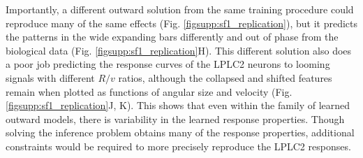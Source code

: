 \documentclass[pdftex,9pt,lineno]{elife}
\begin{document}
Importantly, a different outward solution from the same training procedure could reproduce many of the same effects (Fig. \ref{figsupp:sf1_replication}), but it predicts the patterns in the wide expanding bars differently and out of phase from the biological data (Fig. \ref{figsupp:sf1_replication}H). This different solution also does a poor job predicting the response curves of the LPLC2 neurons to looming signals with different $R/v$ ratios, although the collapsed and shifted features remain when plotted as functions of angular size and velocity (Fig. \ref{figsupp:sf1_replication}J, K). This shows that even within the family of learned outward models, there is variability in the learned response properties. Though solving the inference problem obtains many of the response properties, additional constraints would be required to more precisely reproduce the LPLC2 responses.
\end{document}
